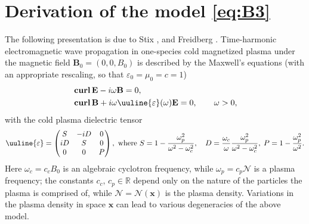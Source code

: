 \documentclass[report]{elsarticle}
\numberwithin{theorem}{section}
\renewcommand{\vec}[1]{\mathbf{#1}}
\begin{document}
	
	
	
	
	
	
	\renewcommand{\appendix}{\par
		\setcounter{section}{0}
		\setcounter{subsection}{0}
		\gdef\thesection{\Alph{section}}
	}

	\appendix

\renewcommand{\appendix}{\par
	\setcounter{section}{0}
	\setcounter{subsection}{0}
	\gdef\thesection{\Alph{section}}
}
\appendix
\section{Derivation of the model \eqref{eq:B3}}
\label{appendix:derivation}
The following presentation is due to Stix \cite{stix1992waves}, and Freidberg \cite[Sections 15.5, 15.6]{freidberg2008plasma}. 
Time-harmonic electromagnetic wave propagation in one-species cold magnetized plasma under the magnetic field $\boldsymbol{B}_0=(0,0,B_0)$ is described by the Maxwell's equations (with an appropriate rescaling, so that $\varepsilon_0=\mu_0=c=1$)
\begin{align*}
&	\operatorname{\textbf{curl}}\vec{E}-i\omega \vec{B}=0,\\
&	\operatorname{\textbf{curl}}\vec{B}+i\omega \uuline{\varepsilon}(\omega)\vec{E}=0,\qquad \omega>0, 
\end{align*}
with the cold plasma dielectric tensor 
\begin{align*}
	\uuline{\varepsilon}=\left(
	\begin{matrix}
	S & -iD & 0 \\
	iD & S & 0\\
	0 & 0 & P
	\end{matrix}
\right), \text{ where }
S=1-\frac{\omega_p^2}{\omega^2-\omega_c^2}, \quad D=\frac{\omega_c}{\omega}\frac{\omega_p^2}{\omega^2-\omega_c^2}, \; P=1-\frac{\omega_p^2}{\omega^2}.
\end{align*}
Here $\omega_c=c_cB_0$ is an algebraic cyclotron frequency, while $\omega_p=c_p\mathcal{N}$ is a plasma frequency;  the constants $c_c, \, c_p\in \mathbb{R}$ depend only on the nature of the particles the plasma is comprised of, while $\mathcal{N}=\mathcal{N}(\vec{x})$ is the plasma density. Variations in the plasma density in space $\vec{x}$ can lead to various degeneracies of the above model. 
\end{document}
